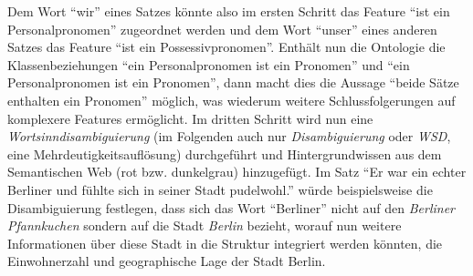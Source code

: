 Dem Wort "`wir"' eines Satzes könnte also im ersten Schritt das Feature "`ist ein Personalpronomen"' zugeordnet werden und dem Wort "`unser"' eines anderen Satzes das Feature "`ist ein Possessivpronomen"'.
Enthält nun die Ontologie die Klassenbeziehungen "`ein Personalpronomen ist ein Pronomen"' und "`ein Personalpronomen ist ein Pronomen"', dann macht dies die Aussage
"`beide Sätze enthalten ein Pronomen"' möglich, was wiederum weitere Schlussfolgerungen auf komplexere Features ermöglicht.
Im dritten Schritt wird nun eine \emph{Wortsinndisambiguierung} (im Folgenden auch nur \emph{Disambiguierung} oder \emph{WSD}, eine Mehrdeutigkeitsauflösung) durchgeführt und Hintergrundwissen aus dem Semantischen Web (rot bzw. dunkelgrau) hinzugefügt.
Im Satz "`Er war ein echter Berliner und fühlte sich in seiner Stadt pudelwohl."' würde beispielsweise die Disambiguierung festlegen, dass sich das Wort "`Berliner"' nicht auf den \emph{Berliner Pfannkuchen} sondern auf
die Stadt \emph{Berlin} bezieht, worauf nun weitere Informationen über diese Stadt in die Struktur integriert werden könnten, \zb{} die Einwohnerzahl und geographische Lage der Stadt Berlin.



